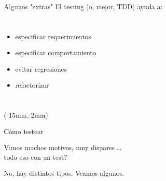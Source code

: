 \begin{frame}[fragile,shrink=2]{Algunos "extras"}
\bigskip
El testing (o, mejor, TDD) ayuda a:
\begin{columns}[onlytextwidth]
	\begin{itemize}
		\item especificar requerimientos
		\item especificar comportamiento
		\item evitar regresiones
		\item refactorizar
	\end{itemize}
	\begin{flushright}
	\end{flushright}
\end{columns}

\begin{textblock*}{30mm}(-15mm,-2mm)
\end{textblock*}
\end{frame}

\begin{frame}{C\'omo testear}
\begin{center}
	Vimos muchos motivos, muy dispares \ldots \\ 
	\textquestiondown todo eso con un test?
\end{center}

\begin{center}
	No, hay distintos tipos. Veamos algunos.
\end{center}
\end{frame}



